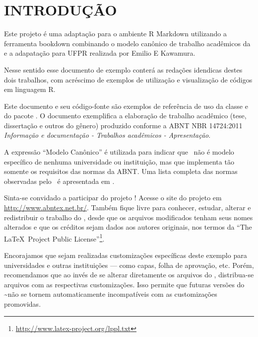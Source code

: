 \documentclass[12pt,openright,oneside,a4paper,chapter=TITLE,section=TITLE,subsection=Title,english,french,spanish,portugues,sumario=tradicional]{04-class-files/abntex2}
\begin{document}




\textual

\pagestyle{simple}

\chapter[INTRODUÇÃO]{INTRODUÇÃO}

Este projeto é uma adaptação para o ambiente R Markdown utilizando a ferramenta bookdown combinando o modelo canônico de trabalho acadêmicos da \abnTeX e a adapatação para UFPR realizada por Emilio E Kawamura.

Nesse sentido esse documento de exemplo conterá as redações idendicas destes dois trabalhos, com acréscimo de exemplos de utilização e visualização de códigos em linguagem R.

Este documento e seu código-fonte são exemplos de referência de uso da classe
\textcite{abntex2} e do pacote \textcite{abntex2cite}. O documento
exemplifica a elaboração de trabalho acadêmico (tese, dissertação e outros do
gênero) produzido conforme a ABNT NBR 14724:2011 \emph{Informação e documentação
- Trabalhos acadêmicos - Apresentação}.

A expressão ``Modelo Canônico'' é utilizada para indicar que \abnTeX~não é
modelo específico de nenhuma universidade ou instituição, mas que implementa tão
somente os requisitos das normas da ABNT. Uma lista completa das normas
observadas pelo \abnTeX~é apresentada em \textcite{abntex2classe}.

Sinta-se convidado a participar do projeto \abnTeX! Acesse o site do projeto em
\url{http://www.abntex.net.br/}. Também fique livre para conhecer,
estudar, alterar e redistribuir o trabalho do \abnTeX, desde que os arquivos
modificados tenham seus nomes alterados e que os créditos sejam dados aos
autores originais, nos termos da ``The \LaTeX~Project Public
License''\footnote{\url{http://www.latex-project.org/lppl.txt}}.

Encorajamos que sejam realizadas customizações específicas deste exemplo para
universidades e outras instituições --- como capas, folha de aprovação, etc.
Porém, recomendamos que ao invés de se alterar diretamente os arquivos do
\abnTeX, distribua-se arquivos com as respectivas customizações.
Isso permite que futuras versões do \abnTeX\textasciitilde{}não se tornem automaticamente
incompatíveis com as customizações promovidas.
\end{document}
